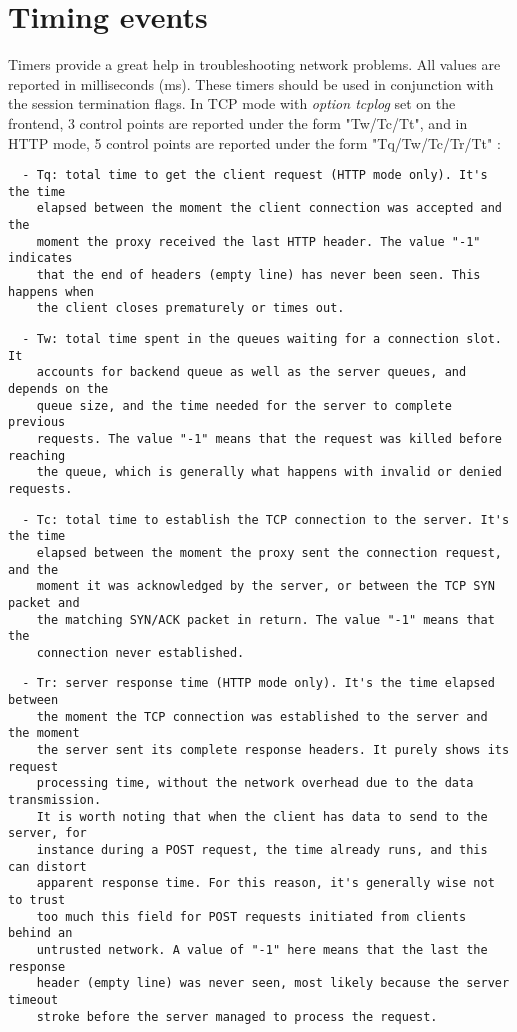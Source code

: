 
\section{Timing events}

Timers provide a great help in troubleshooting network problems. All values are
reported in milliseconds (ms). These timers should be used in conjunction with
the session termination flags. In TCP mode with \emph{option tcplog} set on the
frontend, 3 control points are reported under the form "Tw/Tc/Tt", and in HTTP
mode, 5 control points are reported under the form "Tq/Tw/Tc/Tr/Tt" :

\begin{verbatim}
  - Tq: total time to get the client request (HTTP mode only). It's the time
    elapsed between the moment the client connection was accepted and the
    moment the proxy received the last HTTP header. The value "-1" indicates
    that the end of headers (empty line) has never been seen. This happens when
    the client closes prematurely or times out.
\end{verbatim}

\begin{verbatim}
  - Tw: total time spent in the queues waiting for a connection slot. It
    accounts for backend queue as well as the server queues, and depends on the
    queue size, and the time needed for the server to complete previous
    requests. The value "-1" means that the request was killed before reaching
    the queue, which is generally what happens with invalid or denied requests.
\end{verbatim}

\begin{verbatim}
  - Tc: total time to establish the TCP connection to the server. It's the time
    elapsed between the moment the proxy sent the connection request, and the
    moment it was acknowledged by the server, or between the TCP SYN packet and
    the matching SYN/ACK packet in return. The value "-1" means that the
    connection never established.
\end{verbatim}

\begin{verbatim}
  - Tr: server response time (HTTP mode only). It's the time elapsed between
    the moment the TCP connection was established to the server and the moment
    the server sent its complete response headers. It purely shows its request
    processing time, without the network overhead due to the data transmission.
    It is worth noting that when the client has data to send to the server, for
    instance during a POST request, the time already runs, and this can distort
    apparent response time. For this reason, it's generally wise not to trust
    too much this field for POST requests initiated from clients behind an
    untrusted network. A value of "-1" here means that the last the response
    header (empty line) was never seen, most likely because the server timeout
    stroke before the server managed to process the request.
\end{verbatim}

